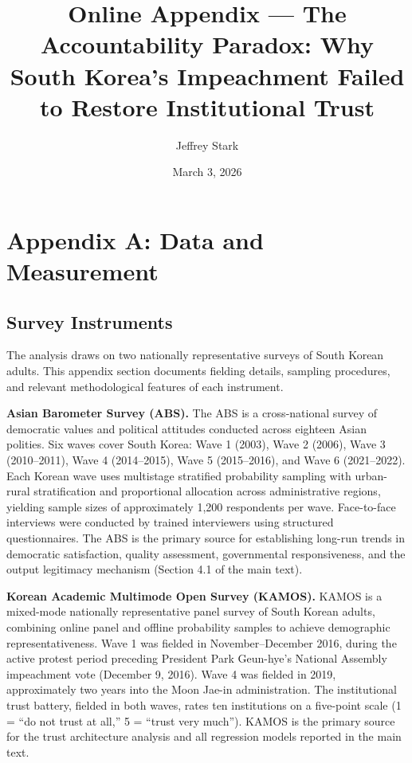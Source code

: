 \documentclass[
  12pt,
  letterpaper]{article}
\title{Online Appendix --- The Accountability Paradox: Why South Korea's
Impeachment Failed to Restore Institutional Trust}
\author{Jeffrey Stark}
\date{March 3, 2026}
\begin{document}
\maketitle


\section{Appendix A: Data and Measurement}\label{sec-data}

\subsection{Survey Instruments}\label{sec-instruments}

The analysis draws on two nationally representative surveys of South
Korean adults. This appendix section documents fielding details,
sampling procedures, and relevant methodological features of each
instrument.

\textbf{Asian Barometer Survey (ABS).} The ABS is a cross-national
survey of democratic values and political attitudes conducted across
eighteen Asian polities. Six waves cover South Korea: Wave 1 (2003),
Wave 2 (2006), Wave 3 (2010--2011), Wave 4 (2014--2015), Wave 5
(2015--2016), and Wave 6 (2021--2022). Each Korean wave uses multistage
stratified probability sampling with urban-rural stratification and
proportional allocation across administrative regions, yielding sample
sizes of approximately 1,200 respondents per wave. Face-to-face
interviews were conducted by trained interviewers using structured
questionnaires. The ABS is the primary source for establishing long-run
trends in democratic satisfaction, quality assessment, governmental
responsiveness, and the output legitimacy mechanism (Section 4.1 of the
main text).

\textbf{Korean Academic Multimode Open Survey (KAMOS).} KAMOS is a
mixed-mode nationally representative panel survey of South Korean
adults, combining online panel and offline probability samples to
achieve demographic representativeness. Wave 1 was fielded in
November--December 2016, during the active protest period preceding
President Park Geun-hye's National Assembly impeachment vote (December
9, 2016). Wave 4 was fielded in 2019, approximately two years into the
Moon Jae-in administration. The institutional trust battery, fielded in
both waves, rates ten institutions on a five-point scale (1 = ``do not
trust at all,'' 5 = ``trust very much''). KAMOS is the primary source
for the trust architecture analysis and all regression models reported
in the main text.
\end{document}
